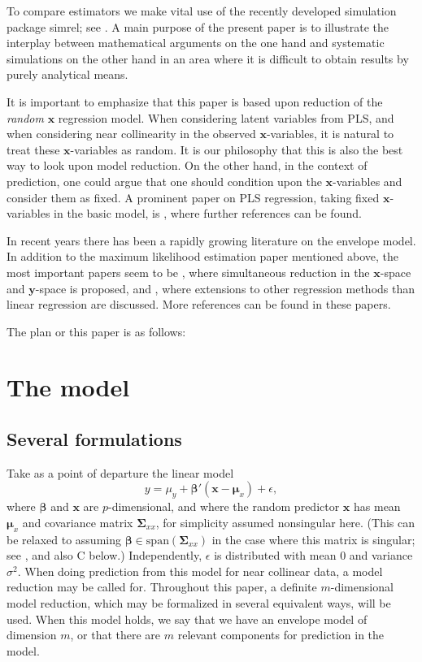 \documentclass[a4paper, 11pt]{article}
\begin{document}
To compare estimators we make vital use of the recently developed simulation
package simrel; see \citet{saebo2015simrel}. A main purpose of the present paper
is to illustrate the interplay between mathematical arguments on the one hand
and systematic simulations on the other hand in an area where it is difficult to
obtain results by purely analytical means.

It is important to emphasize that this paper is based upon reduction of the
\emph{random} $\bm{x}$ regression model. When considering latent variables from
PLS, and when considering near collinearity in the observed $\bm{x}$-variables,
it is natural to treat these $\bm{x}$-variables as random. It is our philosophy
that this is also the best way to look upon model reduction. On the other hand,
in the context of prediction, one could argue that one should condition upon the
$\bm{x}$-variables and consider them as fixed. A prominent paper on PLS
regression, taking fixed $\bm{x}$-variables in the basic model, is
\citet{kramer2012degrees}, where further references can be found.

In recent years there has been a rapidly growing literature on the envelope
model. In addition to the maximum likelihood estimation paper mentioned above,
the most important papers seem to be \citet{cook2015simultaneous}, where
simultaneous reduction in the $\bm{x}$-space and $\bm{y}$-space is proposed, and
\citet{cook2015foundations}, where extensions to other regression methods than
linear regression are discussed. More references can be found in these papers.

The plan or this paper is as follows:

\section{The model}

\subsection{Several formulations}

Take as a point of departure the linear model
\begin{equation}
  \label{model}
  y=\mu_{y}+\bm{\beta}'(\bm{x}-\bm{\mu}_{x})+\epsilon,
\end{equation}
where $\bm{\beta}$ and $\bm{x}$ are $p$-dimensional, and where the random predictor $\bm{x}$ has mean $\bm{\mu}_{x}$ and covariance matrix $\bm{\Sigma}_{xx}$, for simplicity assumed nonsingular here. (This can be relaxed to assuming $\bm{\beta}\in\mathrm{span}(\bm{\Sigma}_{xx})$ in the case where this matrix is singular; see \citet{cook2013envelopes}, and also C below.) Independently, $\epsilon$ is distributed with mean $0$ and variance $\sigma^2$. When doing prediction from this model for near collinear data, a model reduction may be called for. Throughout this paper, a definite $m$-dimensional model reduction, which may be formalized in several equivalent ways, will be used. When this model holds, we say that we have an envelope model of dimension $m$, or that there are $m$ relevant components for prediction in the model.
\smallskip
\end{document}
